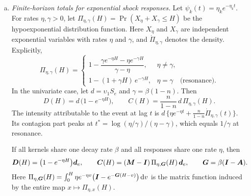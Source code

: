 \begin{proposition}
\begin{enumerate}[(a)]
  \item \emph{Finite-horizon totals for exponential shock responses.} Let
  $\psi_k(t)=\eta_ke^{-\eta_kt}$. For rates $\eta,\gamma>0$, let
  $\Pi_{\eta,\gamma}(H)=\Pr(X_\eta+X_\gamma\le H)$ be the hypoexponential distribution
  function. Here $X_\eta$ and $X_\gamma$ are independent exponential variables with
  rates $\eta$ and $\gamma$, and $\dot\Pi_{\eta,\gamma}$ denotes the density. Explicitly,
  \begin{equation}\label{eq:at-hypoexp}
    \Pi_{\eta,\gamma}(H)=
    \begin{cases}
      1-\dfrac{\gamma e^{-\eta H}-\eta e^{-\gamma H}}{\gamma-\eta}, & \eta\neq\gamma,\\[1.6ex]
      1-(1+\gamma H)\,e^{-\gamma H}, & \eta=\gamma\quad\text{(resonance)}.
    \end{cases}
  \end{equation}
  In the univariate case, let $d=\upsilon_1S_e$ and $\gamma=\beta(1-n)$. Then
  \begin{equation}\label{eq:at-DC-uni}
    D(H)=d\,\bigl(1-e^{-\eta H}\bigr),\qquad
    C(H)=\frac{n}{1-n}\,d\,\Pi_{\eta,\gamma}(H).
  \end{equation}
  The intensity attributable to the event at lag $t$ is
  $d\,\{\eta e^{-\eta t}+\tfrac{n}{1-n}\dot\Pi_{\eta,\gamma}(t)\}$. Its contagion
  part peaks at $t^*=\log(\eta/\gamma)/(\eta-\gamma)$, which equals $1/\gamma$ at
  resonance.

  If all kernels share one decay rate $\beta$ and all responses share one rate $\eta$, then
  \begin{equation}\label{eq:at-DC-common}
    \bm D(H)=\bigl(1-e^{-\eta H}\bigr)\bm d_e,\qquad
    \bm C(H)=(\bm{M}-\bm{I})\,\Pi_{\eta,\bm G}(H)\,\bm d_e,\qquad
    \bm G=\beta(\bm{I}-\bm{A}).
  \end{equation}
  Here
  $\Pi_{\eta,\bm G}(H)=\int_0^H\eta e^{-\eta v}\bigl(\bm{I}-e^{-\bm G(H-v)}\bigr)\,\mathrm{d} v$
  is the matrix function induced by the entire map $x\mapsto\Pi_{\eta,x}(H)$.


\end{enumerate}
\end{proposition}
